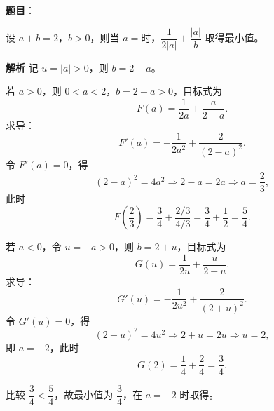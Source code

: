 \begin{answer}

\end{answer}
\begin{answer}

\textbf{题目}：

设 $a+b=2$，$b>0$，则当 $a=$\gkblank{}时，$\dfrac{1}{2|a|}+\dfrac{|a|}{b}$ 取得最小值。

\textbf{解析}
记 $u=|a|>0$，则 $b=2-a$。

若 $a>0$，则 $0<a<2$，$b=2-a>0$，目标式为
\nopagebreak[4]
\[F(a)=\frac1{2a}+\frac{a}{2-a}.\]
求导：
\nopagebreak[4]
\[F'(a)=-\frac1{2a^2}+\frac{2}{(2-a)^2}.\]
令 $F'(a)=0$，得
\nopagebreak[4]
\[(2-a)^2=4a^2\Longrightarrow 2-a=2a\Longrightarrow a=\frac23,\]
此时
\nopagebreak[4]
\[F\left(\frac23\right)=\frac34+\frac{2/3}{4/3}=\frac34+\frac12=\frac54.\]

若 $a<0$，令 $u=-a>0$，则 $b=2+u$，目标式为
\nopagebreak[4]
\[G(u)=\frac1{2u}+\frac{u}{2+u}.\]
求导：
\nopagebreak[4]
\[G'(u)=-\frac1{2u^2}+\frac{2}{(2+u)^2}.\]
令 $G'(u)=0$，得
\nopagebreak[4]
\[(2+u)^2=4u^2\Longrightarrow 2+u=2u\Longrightarrow u=2,\]
即 $a=-2$，此时
\nopagebreak[4]
\[G(2)=\frac14+\frac24=\frac34.\]

比较 $\dfrac34<\dfrac54$，故最小值为 $\dfrac34$，在 $a=-2$ 时取得。


\end{answer}
